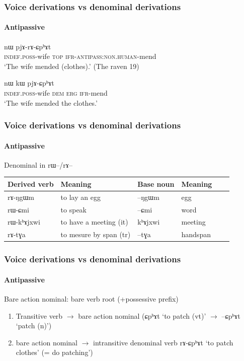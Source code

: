 \documentclass[xcolor=table]{beamer}
\newcommand{\ipa}[1]{{\phon \mbox{#1}}} %
\begin{document}
\begin{frame} 
\frametitle{Voice derivations vs denominal derivations} 
\framesubtitle{Antipassive} 
  \begin{exe}
\ex
\gll \ipa{tɤ-rʑaβ} 	\ipa{nɯ} 	\ipa{pjɤ-rɤ-ɕpʰɤt}   \\
    \textsc{indef.poss}-wife \textsc{top} \textsc{ifr-antipass:non.human}-mend \\
 \glt    `The wife mended (clothes).' (The raven 19)
\end{exe} 
 
   \begin{exe}
\ex
\gll \ipa{tɤ-rʑaβ} 	\ipa{nɯ} 	\ipa{kɯ}	\ipa{pjɤ-ɕpʰɤt}   \\
    \textsc{indef.poss}-wife \textsc{dem} \textsc{erg} \textsc{ifr}-mend \\
 \glt    `The wife mended the clothes.' 
\end{exe} 

\end{frame}   
 
\begin{frame} 
\frametitle{Voice derivations vs denominal derivations} 
\framesubtitle{Antipassive} 
Denominal in \ipa{rɯ--}/\ipa{rɤ--}
\begin{tabular}{llllll}
\toprule
 Derived verb& Meaning &Base noun  & Meaning \\
\midrule
  \ipa{rɤ-ŋgɯm} & to lay an egg & \ipa{--ŋgɯm} &egg \\
  \ipa{rɯ-ɕmi} & to speak & \ipa{--ɕmi} & word  \\
  \ipa{rɯ-kʰɤjxwi} & to have a meeting (it) & \ipa{kʰɤjxwi} & meeting \\
 \midrule
\ipa{rɤ-tɣa}  &	 to mesure by span  (tr)&	\ipa{--tɣa}  &	handspan  \\
 \bottomrule
\end{tabular}
\end{frame}    
 
 \begin{frame} 
\frametitle{Voice derivations vs denominal derivations} 
\framesubtitle{Antipassive} 
 
Bare action nominal: bare verb root (+possessive prefix)
 \begin{enumerate}
\item Transitive verb $\rightarrow$ bare action nominal (\ipa{ɕpʰɤt} `to patch (vt)' $\rightarrow$ \ipa{--ɕpʰɤt} `patch (n)')
\item bare action nominal $\rightarrow$ intransitive denominal verb \ipa{rɤ-ɕpʰɤt} `to patch clothes' (= do patching')
\end{enumerate}
 
\end{frame}    
 
\end{document}

